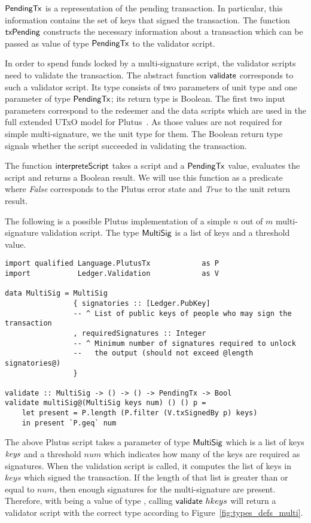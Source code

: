 \documentclass[11pt,a4paper,dvipsnames]{article}
\newcommand{\PendingTx}{\type{PendingTx}}
\theoremstyle{definition}
\begin{document}
$\PendingTx$ is a representation of the pending transaction. In particular, this
information contains the set of keys that signed the transaction. The function
$\mathsf{txPending}$ constructs the necessary information about a transaction
which can be passed as value of type $\PendingTx$ to the validator script.

In order to spend funds locked by a multi-signature script, the validator
scripts need to validate the transaction. The abstract function $\mathsf{validate}$
corresponds to such a validator script. Its type consists of two parameters of
unit type and one parameter of type $\PendingTx$; its return type is
Boolean. The first two input parameters correspond to the redeemer and the data
scripts which are used in the full extended UTxO model for
Plutus~\cite{plutus_eutxo}. As those values are not required for simple
multi-signature, we the unit type for them. The Boolean return type signals
whether the script succeeded in validating the transaction.

The function $\mathsf{interpreteScript}$ takes a script and a $\PendingTx$ value,
evaluates the script and returns a Boolean result. We will use this function as
a predicate where \emph{False} corresponds to the Plutus error state and
\emph{True} to the unit return result.

The following is a possible Plutus implementation of a simple $n$ out of $m$
multi-signature validation script. The type $\mathsf{MultiSig}$ is a list of keys
and a threshold value.

\begin{verbatim}
import qualified Language.PlutusTx            as P
import           Ledger.Validation            as V

data MultiSig = MultiSig
                { signatories :: [Ledger.PubKey]
                -- ^ List of public keys of people who may sign the transaction
                , requiredSignatures :: Integer
                -- ^ Minimum number of signatures required to unlock
                --   the output (should not exceed @length signatories@)
                }

validate :: MultiSig -> () -> () -> PendingTx -> Bool
validate multiSig@(MultiSig keys num) () () p =
    let present = P.length (P.filter (V.txSignedBy p) keys)
    in present `P.geq` num
\end{verbatim}

The above Plutus script takes a parameter  of type
$\mathsf{MultiSig}$ which is a list of keys $\mathit{keys}$ and a threshold $num$
which indicates how many of the keys are required as signatures. When the
validation script is called, it computes the list of keys in $keys$ which signed
the transaction. If the length of that list is greater than or equal to $num$,
then enough signatures for the multi-signature are present. Therefore, with
 being a value of type , calling
$\mathsf{validate}~hkeys$ will return a validator script with the correct type
according to Figure~\ref{fig:types_defs_multi}.
\end{document}
